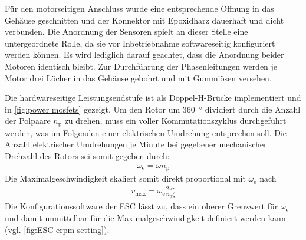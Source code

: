 	Für den motorseitigen Anschluss wurde eine entsprechende Öffnung in das Gehäuse geschnitten und der Konnektor mit Epoxidharz dauerhaft und dicht verbunden.
	Die Anordnung der Sensoren spielt an dieser Stelle eine untergeordnete Rolle, da sie vor Inbetriebnahme softwareseitig konfiguriert werden können.
	Es wird lediglich darauf geachtet, dass die Anordnung beider Motoren identisch bleibt.
	Zur Durchführung der Phasenleitungen werden je Motor drei Löcher in das Gehäuse gebohrt und mit Gummiösen versehen.\par\medskip
	Die hardwareseitige Leistungsendstufe ist als Doppel-H-Brücke implementiert und in \cref{fig:power mosfets} gezeigt.
	Um den Rotor um \qty{360}{\degree} dividiert durch die Anzahl der Polpaare \(n_\text{p}\) zu drehen, muss ein voller Kommutationszyklus durchgeführt werden, was im Folgenden einer elektrischen Umdrehung entsprechen soll.
	Die Anzahl elektrischer Umdrehungen je Minute bei gegebener mechanischer Drehzahl des Rotors sei somit gegeben durch:
	\begin{align}
		\omega_\text{e} = \omega n_\text{p}
		\label{eq:ERPM and RPM}
	\end{align}
	Die Maximalgeschwindigkeit skaliert somit direkt proportional mit \(\omega_\text{e}\) nach
	\begin{align}
		v_\text{max} = \omega_\text{e} \frac{2\pi r}{n_\text{p} \zeta}
		\label{eq:max speed by ERPM}
	\end{align}
	Die Konfigurationssoftware der ESC lässt zu, dass ein oberer Grenzwert für \(\omega_\text{e}\) und damit unmittelbar für die Maximalgeschwindigkeit definiert werden kann (vgl. \cref{fig:ESC erpm setting}).


